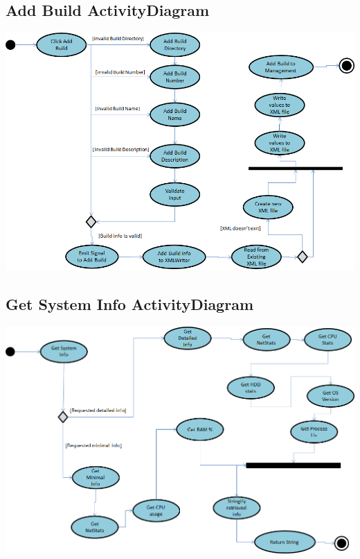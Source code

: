 \documentclass[a4paper,12pt,final]{article}
\begin{document}
\subsection{Add Build ActivityDiagram}
\begin{center}
\includegraphics[scale=0.37]{AddBuildActivity.png} 
\end{center}
\subsection{Get System Info ActivityDiagram}
\begin{center}
\includegraphics[scale=0.37]{GetSystemInfo.png} 
\end{center}
\end{document}
